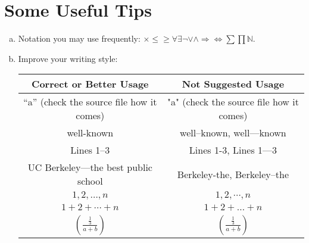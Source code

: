 \documentclass{article}
\begin{document}
\begin{enumerate}[(a)]
\begin{enumerate}[(a)]
\end{enumerate}


\section{Some Useful Tips}

\begin{enumerate}[(a)]
\item Notation you may use frequently: $\times \leq \geq \forall \exists \neg \vee \wedge \Longrightarrow \Longleftrightarrow \sum \prod \mathbb{N}$.
\item Improve your writing style:
\begin{center}
\begin{tabular}{|c|c|}\hline
	\textbf{Correct or Better Usage}			& \textbf{Not Suggested	Usage}				\\\hline\hline
	``a'' (check the source file how it comes)	& "a" (check the source file how it comes)	\\\hline
	well-known									& well--known, well---known					\\
	Lines 1--3									& Lines 1-3, Lines 1---3					\\
	UC Berkeley---the best public school		& Berkeley-the, Berkeley--the				\\\hline
	$1,2,\ldots,n$								& $1,2,\cdots,n$							\\
	$1+2+\cdots+n$								& $1+2+\ldots+n$							\\\hline
	$\left(\frac{\frac{1}{3}}{a+b}\right)$		& $(\frac{\frac{1}{3}}{a+b})$				\\\hline
\end{tabular}
\end{center}
\end{enumerate}


\end{document}
